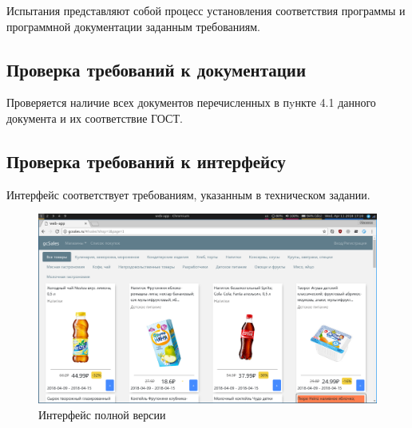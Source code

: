 Испытания представляют собой процесс установления соответствия программы и
программной документации заданным требованиям.

\subsection{Проверка требований к документации}
Проверяется наличие всех документов перечисленных в пyнкте 4.1 данного документа и их соответствие ГОСТ.

\subsection{Проверка требований к интерфейсу}
Интерфейс соответствует требованиям, указанным в техническом задании. 

\begin{figure}[H]
    \centering
    \includegraphics[width=\textwidth]{./screenshots/interface_main.png}
    \caption{Интерфейс полной версии }
    \endminipage
    \vspace{2cm}

\end{figure}
